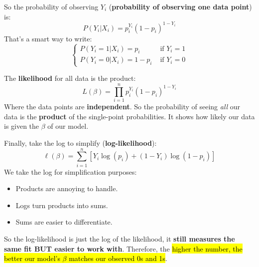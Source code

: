 \highspace
So the probability of observing $Y_i$ (\textbf{probability of observing one data point}) is:
\begin{equation*}
    P\left(Y_i | X_i\right) = p_i^{Y_i} (1 - p_i)^{1 - Y_i}
\end{equation*}
That's a smart way to write:
\begin{equation*}
    \begin{cases}
        P\left(Y_i = 1 | X_i\right) = p_i      & \text{ if } Y_i = 1 \\
        P\left(Y_i = 0 | X_i\right) = 1 - p_i  & \text{ if } Y_i = 0
    \end{cases}
\end{equation*}

\highspace
The \textbf{likelihood} for all data is the product:
\begin{equation}
    L(\beta) = \displaystyle\prod_{i=1}^n p_i^{Y_i} (1 - p_i)^{1 - Y_i}
\end{equation}
Where the data points are \textbf{independent}. So the probability of seeing \emph{all} our data is the \textbf{product} of the single-point probabilities. It shows how likely our data is given the $\beta$ of our model.

\highspace
Finally, take the log to simplify (\textbf{log-likelihood}):
\begin{equation}
    \ell(\beta) = \sum_{i=1}^n \left[ Y_i \log\left(p_i\right) + \left(1 - Y_i\right) \log\left(1 - p_i\right) \right]
\end{equation}
We take the log for simplification purposes:
\begin{itemize}
    \item Products are annoying to handle.
    \item Logs turn products into sums.
    \item Sums are easier to differentiate.
\end{itemize}
So the log-likelihood is just the log of the likelihood, it \textbf{still measures the same fit BUT easier to work with}. Therefore, the \hl{higher the number, the better our model's $\beta$ matches our observed 0s and 1s}.

